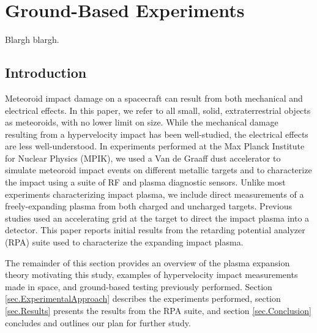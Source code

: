 
\chapter{Ground-Based Experiments}
\label{ch.GroundBasedExperiments}

Blargh blargh.
\section{Introduction}
\label{sec.Introduction}
Meteoroid impact damage on a spacecraft can result from both mechanical and electrical effects.  In this paper, we refer to all small, solid, extraterrestrial objects as meteoroids, with no lower limit on size.  While the mechanical damage resulting from a hypervelocity impact has been well-studied, the electrical effects are less well-understood.  In experiments performed at the Max Planck Institute for Nuclear Physics (MPIK), we used a Van de Graaff dust accelerator to simulate meteoroid impact events on different metallic targets and to characterize the impact using a suite of RF and plasma diagnostic sensors.  Unlike most experiments characterizing impact plasma, we include direct measurements of a freely-expanding plasma from both charged and uncharged targets.  Previous studies used an accelerating grid at the target to direct the impact plasma into a detector.  This paper reports initial results from the retarding potential analyzer (RPA) suite used to characterize the expanding impact plasma.

The remainder of this section provides an overview of the plasma expansion theory motivating this study, examples of hypervelocity impact measurements made in space, and ground-based testing previously performed.  Section \ref{sec.ExperimentalApproach} describes the experiments performed, section \ref{sec.Results} presents the results from the RPA suite, and section \ref{sec.Conclusion} concludes and outlines our plan for further study.

